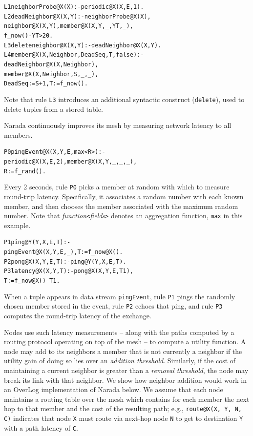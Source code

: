 \documentclass{sig-alt-full}
\def\Lang{OverLog\xspace}
\newcommand{\ol}[1]{{\tt\footnotesize#1}}
\newenvironment{overlog}{\begin{alltt}\small}{\end{alltt}}
\begin{document}
\begin{overlog}
L1 neighborProbe@X(X) :- periodic@X(X, E, 1).
L2 deadNeighbor@X(X, Y) :- neighborProbe@X(X),
  neighbor@X(X, Y), member@X(X, Y, _, YT, _), 
  f_now() - YT > 20.
L3 delete neighbor@X(X, Y) :- deadNeighbor@X(X, Y).
L4 member@X(X, Neighbor, DeadSeq, T, false) :-
  deadNeighbor@X(X, Neighbor),
  member@X(X, Neighbor, S, _, _),
  DeadSeq := S + 1, T:= f_now().
\end{overlog}

\noindent{}Note that rule \ol{L3} introduces an additional syntactic
construct (\ol{delete}), used to delete tuples from a stored table.


Narada continuously improves its mesh by measuring network latency to
all members.
\begin{overlog}
P0 pingEvent@X(X, Y, E, max<R>) :-
  periodic@X(X, E, 2), member@X(X, Y, _, _, _),
  R := f_rand().
\end{overlog}
\noindent{}Every 2 seconds, rule \ol{P0} picks a member at random with
which to measure round-trip latency. Specifically, it associates a
random number with each known member, and then chooses the member
associated with the maximum random number. Note that
\emph{function}\ol{<}\emph{fields}\ol{>} denotes an aggregation
function, \ol{max} in this example.
\begin{overlog}
P1 ping@Y(Y, X, E, T) :-
  pingEvent@X(X, Y, E, _), T := f_now@X().
P2 pong@X(X, Y, E, T) :- ping@Y(Y, X, E, T).
P3 latency@X(X, Y, T) :- pong@X(X, Y, E, T1),
  T := f_now@X() - T1.
\end{overlog}
When a tuple appears in data stream \ol{pingEvent}, rule \ol{P1} pings
the randomly chosen member stored in the event, 
rule \ol{P2} echoes that ping, and rule \ol{P3} computes the
round-trip latency of the exchange.

Nodes use such latency measurements -- along with the paths computed by a
routing protocol operating on top of the mesh -- to compute a utility
function.  A node may add to its neighbors a member that is not currently a neighbor 
if the utility gain of doing so lies over an
\emph{addition threshold}.  Similarly, if the cost of maintaining a
current neighbor is greater than a \emph{removal threshold}, the node
may break its link with that neighbor.  We show how neighbor addition
would work in an
\Lang implementation of Narada below.  We assume that each node
maintains a routing table over the mesh which contains for each member
the next hop to that member and the cost of the resulting path; e.g.,
\ol{route@X(X, Y, N, C)} indicates that node \ol{X} must route via
next-hop node \ol{N} to get to destination \ol{Y} with a path latency of
\ol{C}.
\end{document}
